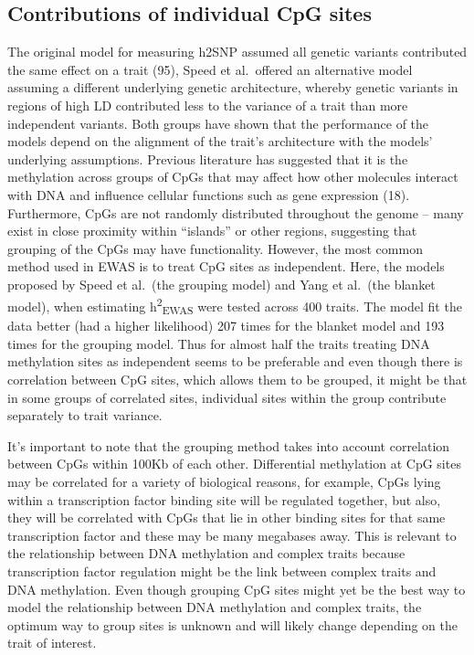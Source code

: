 \documentclass[11pt,oneside]{bristolthesis}
\begin{document}
\hypertarget{contribution-of-individual-cpg-sites}{%
\subsection{Contributions of individual CpG sites}\label{contribution-of-individual-cpg-sites}}

The original model for measuring h2SNP assumed all genetic variants contributed the same effect on a trait (95), Speed et al.~offered an alternative model assuming a different underlying genetic architecture, whereby genetic variants in regions of high LD contributed less to the variance of a trait than more independent variants. Both groups have shown that the performance of the models depend on the alignment of the trait's architecture with the models' underlying assumptions. Previous literature has suggested that it is the methylation across groups of CpGs that may affect how other molecules interact with DNA and influence cellular functions such as gene expression (18). Furthermore, CpGs are not randomly distributed throughout the genome -- many exist in close proximity within ``islands'' or other regions, suggesting that grouping of the CpGs may have functionality. However, the most common method used in EWAS is to treat CpG sites as independent. Here, the models proposed by Speed et al.~(the grouping model) and Yang et al.~(the blanket model), when estimating h\textsuperscript{2}\textsubscript{EWAS} were tested across 400 traits. The model fit the data better (had a higher likelihood) 207 times for the blanket model and 193 times for the grouping model. Thus for almost half the traits treating DNA methylation sites as independent seems to be preferable and even though there is correlation between CpG sites, which allows them to be grouped, it might be that in some groups of correlated sites, individual sites within the group contribute separately to trait variance.

It's important to note that the grouping method takes into account correlation between CpGs within 100Kb of each other. Differential methylation at CpG sites may be correlated for a variety of biological reasons, for example, CpGs lying within a transcription factor binding site will be regulated together, but also, they will be correlated with CpGs that lie in other binding sites for that same transcription factor and these may be many megabases away. This is relevant to the relationship between DNA methylation and complex traits because transcription factor regulation might be the link between complex traits and DNA methylation. Even though grouping CpG sites might yet be the best way to model the relationship between DNA methylation and complex traits, the optimum way to group sites is unknown and will likely change depending on the trait of interest.
\end{document}
